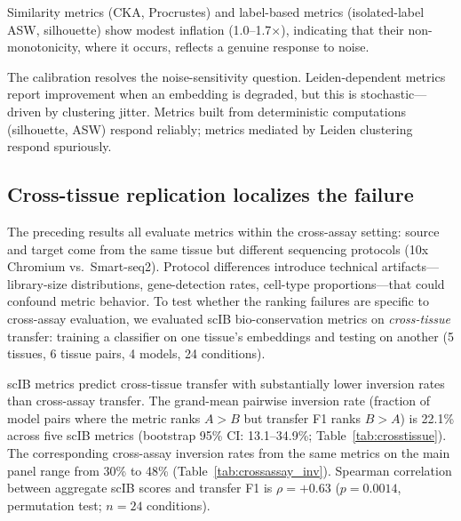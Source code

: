 \documentclass[11pt]{article}
\begin{document}
Similarity metrics (CKA, Procrustes) and label-based metrics
(isolated-label ASW, silhouette) show modest inflation
(1.0--1.7$\times$), indicating that their non-monotonicity, where it
occurs, reflects a genuine response to noise.

The calibration resolves the noise-sensitivity question. Leiden-dependent
metrics report improvement when an embedding is degraded, but this is
stochastic---driven by clustering jitter. Metrics built from
deterministic computations (silhouette, ASW) respond reliably; metrics
mediated by Leiden clustering respond spuriously.


\subsection{Cross-tissue replication localizes the failure}
\label{sec:crosstissue}

The preceding results all evaluate metrics within the cross-assay
setting: source and target come from the same tissue but different
sequencing protocols (10x Chromium vs.\ Smart-seq2). Protocol
differences introduce technical artifacts---library-size distributions,
gene-detection rates, cell-type proportions---that could confound metric
behavior. To test whether the ranking failures are specific to
cross-assay evaluation, we evaluated scIB bio-conservation metrics on
\emph{cross-tissue} transfer: training a classifier on one tissue's
embeddings and testing on another (5 tissues, 6 tissue pairs, 4 models,
24 conditions).

scIB metrics predict cross-tissue transfer with substantially lower
inversion rates than cross-assay transfer. The grand-mean pairwise
inversion rate (fraction of model pairs where the metric ranks
$A > B$ but transfer F1 ranks $B > A$) is 22.1\% across five scIB
metrics (bootstrap 95\% CI: 13.1--34.9\%;
Table~\ref{tab:crosstissue}). The corresponding cross-assay inversion
rates from the same metrics on the main panel range from 30\% to 48\%
(Table~\ref{tab:crossassay_inv}). Spearman correlation between
aggregate scIB scores and transfer F1 is $\rho = +0.63$ ($p = 0.0014$,
permutation test; $n = 24$ conditions).
\end{document}
